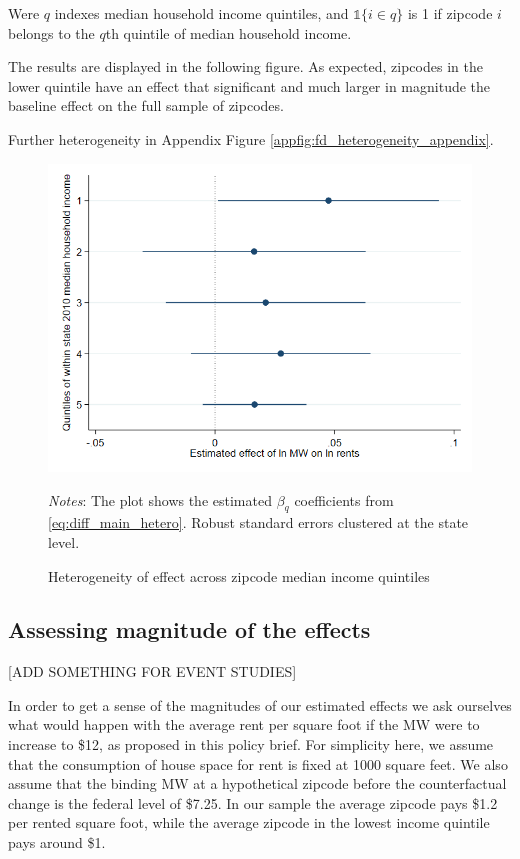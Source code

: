     Were $q$ indexes median household income quintiles, and $\mathds{1}\{i\in q\}$ is 1 if zipcode $i$ belongs to the $q$th quintile of median household income. 
    
    The results are displayed in the following figure. As expected, zipcodes in the lower quintile have an effect that significant and much larger in magnitude the baseline effect on the full sample of zipcodes.
    
    Further heterogeneity in Appendix Figure \ref{appfig:fd_heterogeneity_appendix}.
    
    \begin{figure}[h!] \centering
        \caption{Heterogeneity of effect across zipcode median income quintiles}
        \label{fig:fd_heterogeneity_income}
        \includegraphics[width=0.75\linewidth]{analysis/first_differences/output/fd_static_heter_med_hhinc20105.png}
        \begin{minipage}{.95\textwidth} \footnotesize
			\vspace{2mm} 
			\textit{Notes}: The plot shows the estimated $\beta_{q}$ coefficients from \autoref{eq:diff_main_hetero}. Robust standard errors clustered at the state level. 
		\end{minipage}
    \end{figure}
    
\subsection{Assessing magnitude of the effects}\label{subsec:results/magnitude}

    [ADD SOMETHING FOR EVENT STUDIES]

    In order to get a sense of the magnitudes of our estimated effects we ask ourselves what would happen with the average rent per square foot if the MW were to increase to \$12, as proposed in this policy brief. For simplicity here, we assume that the consumption of house space for rent is fixed at 1000 square feet. We also assume that the binding MW at a hypothetical zipcode before the counterfactual change is the federal level of \$7.25. In our sample the average zipcode pays \$1.2 per rented square foot, while the average zipcode in the lowest income quintile pays around \$1.
    
